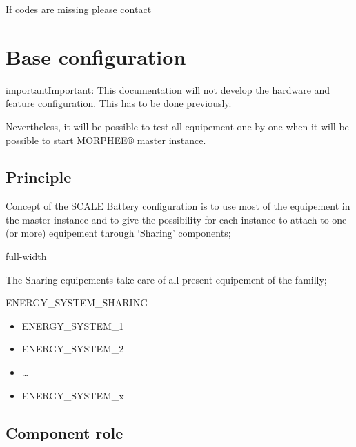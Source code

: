 \documentclass[letterpaper,10pt,english]{jupyterBook}
\begin{document}
\sphinxAtStartPar
If codes are missing please contact 


\chapter{Base configuration}
\label{\detokenize{04_Base-configuration:base-configuration}}\label{\detokenize{04_Base-configuration::doc}}
\begin{sphinxadmonition}{important}{Important:}
\sphinxAtStartPar
This documentation will not develop the hardware and feature configuration.
This has to be done previously.

\sphinxAtStartPar
Nevertheless, it will be possible to test all equipement one by one when it will be possible to start MORPHEE® master instance.
\end{sphinxadmonition}


\section{Principle}
\label{\detokenize{04_Base-configuration:principle}}
\sphinxAtStartPar
Concept of the SCALE Battery configuration is to use most of the equipement in the master instance and to give the possibility for each instance to attach to one (or more) equipement through ‘Sharing’ components;

\begin{sphinxuseclass}{full-width}
\noindent{}

\end{sphinxuseclass}
\sphinxAtStartPar
The Sharing equipements take care of all present equipement of the familly;

\sphinxAtStartPar
ENERGY\_SYSTEM\_SHARING
\begin{itemize}
\item {} 
\sphinxAtStartPar
ENERGY\_SYSTEM\_1

\item {} 
\sphinxAtStartPar
ENERGY\_SYSTEM\_2

\item {} 
\sphinxAtStartPar
…

\item {} 
\sphinxAtStartPar
ENERGY\_SYSTEM\_x

\end{itemize}


\section{Component role}
\label{\detokenize{04_Base-configuration:component-role}}
\end{document}
